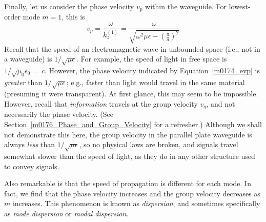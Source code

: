 Finally, let us consider the phase velocity $v_p$ within the waveguide.
For lowest-order mode $m=1$, this is 
%
\begin{equation}
v_p = \frac{\omega}{k_z^{(1)}} = \frac{\omega}{\sqrt{\omega^2\mu\epsilon-\left(\frac{\pi}{a}\right)^2}}
\label{m0174_evp}
\end{equation}
%
Recall that the speed of an electromagnetic wave in unbounded space (i.e., not in a waveguide) is $1/\sqrt{\mu\epsilon}$. 
For example, the speed of light in free space is $1/\sqrt{\mu_0\epsilon_0}=c$.  
However, the phase velocity indicated by Equation~\ref{m0174_evp} is \emph{greater} than $1/\sqrt{\mu\epsilon}$; e.g., faster than light would travel in the same material (presuming it were transparent).
At first glance, this may seem to be impossible.
However, recall that \emph{information} travels at the group velocity $v_g$, 
and not necessarily the phase velocity. 
(See Section~\ref{m0176_Phase_and_Group_Velocity} for a refresher.)
Although we shall not demonstrate this here, the group velocity in the parallel plate waveguide is always \emph{less} than $1/\sqrt{\mu\epsilon}$, so no physical laws are broken, and signals travel somewhat slower than the speed of light, as they do in any other structure used to convey signals.

Also remarkable is that the speed of propagation is different for each mode.  In fact, we find that the phase velocity increases and the group velocity decreases as $m$ increases.  This phenomenon is known as \emph{dispersion},
and sometimes specifically as \emph{mode dispersion} or
\emph{modal dispersion}.




